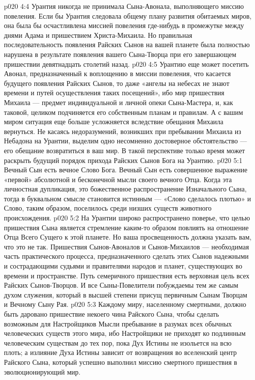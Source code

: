 \vs p020 4:4 \pc Урантия никогда не принимала Сына\hyp{}Авонала, выполняющего миссию повеления. Если бы Урантия следовала общему плану развития обитаемых миров, она была бы осчастливлена миссией повеления где\hyp{}нибудь в промежутке между днями Адама и пришествием Христа\hyp{}Михаила. Но правильная последовательность появления Райских Сынов на вашей планете была полностью нарушена в результате появления вашего Сына\hyp{}Творца при его завершающем пришествии девятнадцать столетий назад.
\vs p020 4:5 Урантию еще может посетить Авонал, предназначенный к воплощению в миссии повеления, что касается будущего появления Райских Сынов, то даже «ангелы на небесах не знают времени и путей осуществления таких посещений», ибо мир пришествия Михаила --- предмет индивидуальной и личной опеки Сына\hyp{}Мастера, и, как таковой, целиком подчиняется его собственным планам и правилам. А с вашим миром ситуация еще больше усложняется вследствие обещания Михаила вернуться. Не касаясь недоразумений, возникших при пребывании Михаила из Небадона на Урантии, выделим одно несомненно достоверное обстоятельство --- его обещание возвратиться в ваш мир. В такой перспективе только время может раскрыть будущий порядок прихода Райских Сынов Бога на Урантию.
\vs p020 5:1 Вечный Сын есть вечное Слово Бога. Вечный Сын есть совершенное выражение «первой» абсолютной и бесконечной мысли своего вечного Отца. Когда эта личностная дупликация, это божественное распространение Изначального Сына, тогда в буквальном смысле становится истинным --- «Слово сделалось плотью» и Слово, таким образом, поселилось среди низших существ животного происхождения.
\vs p020 5:2 На Урантии широко распространено поверье, что целью пришествия Сына является стремление каким\hyp{}то образом повлиять на отношение Отца Всего Сущего к этой планете. Но ваша просвещенность должна указать вам, что это не так. Пришествия Сынов\hyp{}Авоналов и Сынов\hyp{}Михаилов --- необходимая часть практического процесса, предназначенного сделать этих Сынов надежными и сострадающими судьями и правителями народов и планет, существующих во времени и пространстве. Путь семеричного пришествия есть верховная цель всех Райских Сынов\hyp{}Творцов. И все Сыны\hyp{}Повелители побуждаемы тем же самым духом служения, который в высшей степени присущ первичным Сынам Творцам и Вечному Сыну Рая.
\vs p020 5:3 Каждому миру, населенному смертными, должно быть даровано пришествие некоего чина Райского Сына, чтобы сделать возможным для Настройщиков Мысли пребывание в разумах всех обычных человеческих существ этого мира, ибо Настройщики не приходят ко  подлинным человеческим существам до тех пор, пока Дух Истины не изольется на всю плоть; а излияние Духа Истины зависит от возвращения во вселенский центр Райского Сына, который успешно выполнил миссию смертного пришествия в эволюционирующий мир.
